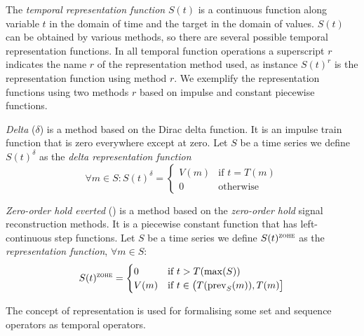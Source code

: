 The \emph{temporal representation function} $S(t)$ is a continuous
function along variable $t$ in the domain of time and the target in
the domain of values. $S(t)$ can be obtained by various methods, so
there are several possible temporal representation functions. In all
temporal function operations a superscript $r$ indicates the name $r$
of the representation method used, as instance $S(t)^r$ is the
representation function using method $r$. We exemplify the
representation functions using two methods $r$ based on impulse and
constant piecewise functions.


\begin{example}
  \emph{Delta} ($\delta$) is a method based on the Dirac delta
  function. It is an impulse train function that is zero everywhere
  except at zero.  Let $S$ be a time series we define $S(t)^\delta$ as
  the \emph{delta representation function}
\[
    \forall m \in S: S(t)^\delta
    =  \begin{cases}
      V(m) & \text{if }  t=T(m) \\
      0 & \text{otherwise}
    \end{cases}
\]
\end{example}

\begin{example}
  \emph{Zero-order hold everted} (\zohe{}) is a method based on the
  \emph{zero-order hold} signal reconstruction methods. It is a
  piecewise constant function that has left-continuous step functions.
  Let $S$ be a time series we define $S(t)^\zohe$ as the \emph{\zohe{}
    representation function}, $\forall m \in S:$
\[
    S(t)^\zohe 
    = \begin{cases}
      0 & \text{if }  t > T(\max(S)) \\
      V(m) & \text{if } t\in \big(T(\prev_S(m)),T(m)\big]
    \end{cases}
\]
\end{example}  




The concept of representation is used for formalising some set and
sequence operators as temporal operators. 

